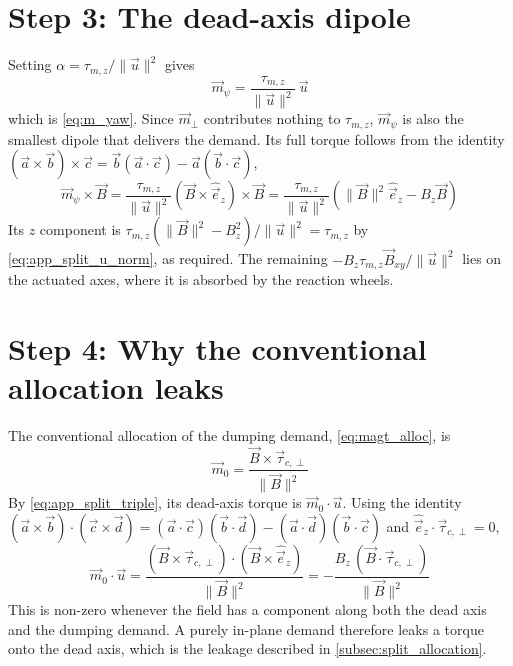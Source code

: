 \section*{Step 3: The dead-axis dipole}
Setting $\alpha = \tau_{m,z}/\|\vec{u}\|^2$ gives
\begin{equation*}
    \vec{m}_\psi = \frac{\tau_{m,z}}{\|\vec{u}\|^2}\,\vec{u}
\end{equation*}
which is \autoref{eq:m_yaw}. Since $\vec{m}_\perp$ contributes nothing to $\tau_{m,z}$, $\vec{m}_\psi$ is also the smallest dipole that delivers the demand. Its full torque follows from the identity $(\vec{a}\times\vec{b})\times\vec{c} = \vec{b}(\vec{a}\cdot\vec{c}) - \vec{a}(\vec{b}\cdot\vec{c})$,
\begin{equation*}
    \vec{m}_\psi\times\vec{B} = \frac{\tau_{m,z}}{\|\vec{u}\|^2}(\vec{B}\times\hat{\vec{e}}_z)\times\vec{B} = \frac{\tau_{m,z}}{\|\vec{u}\|^2}\left(\|\vec{B}\|^2\hat{\vec{e}}_z - B_z\vec{B}\right)
\end{equation*}
Its $z$ component is $\tau_{m,z}(\|\vec{B}\|^2 - B_z^2)/\|\vec{u}\|^2 = \tau_{m,z}$ by \autoref{eq:app_split_u_norm}, as required. The remaining $-B_z\tau_{m,z}\vec{B}_{xy}/\|\vec{u}\|^2$ lies on the actuated axes, where it is absorbed by the reaction wheels.

\section*{Step 4: Why the conventional allocation leaks}
The conventional allocation of the dumping demand, \autoref{eq:magt_alloc}, is
\begin{equation*}
    \vec{m}_0 = \frac{\vec{B}\times\vec{\tau}_{c,\perp}}{\|\vec{B}\|^2}
\end{equation*}
By \autoref{eq:app_split_triple}, its dead-axis torque is $\vec{m}_0\cdot\vec{u}$. Using the identity $(\vec{a}\times\vec{b})\cdot(\vec{c}\times\vec{d}) = (\vec{a}\cdot\vec{c})(\vec{b}\cdot\vec{d}) - (\vec{a}\cdot\vec{d})(\vec{b}\cdot\vec{c})$ and $\hat{\vec{e}}_z\cdot\vec{\tau}_{c,\perp} = 0$,
\begin{equation*}
    \vec{m}_0\cdot\vec{u} = \frac{(\vec{B}\times\vec{\tau}_{c,\perp})\cdot(\vec{B}\times\hat{\vec{e}}_z)}{\|\vec{B}\|^2} = -\frac{B_z\,(\vec{B}\cdot\vec{\tau}_{c,\perp})}{\|\vec{B}\|^2}
\end{equation*}
This is non-zero whenever the field has a component along both the dead axis and the dumping demand. A purely in-plane demand therefore leaks a torque onto the dead axis, which is the leakage described in \autoref{subsec:split_allocation}.

